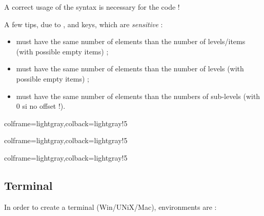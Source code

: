 \documentclass[11pt,a4paper]{ltxdoc}
\begin{document}
A correct usage of the syntax is necessary for the code !

\vspace{5mm}

A few tips, due to ,  and  keys, which are \textit{sensitive} :

\begin{itemize}
	\item {} must have the same number of elements than the number of levels/items (with possible empty items) ;
	\item {} must have the same number of elements than the number of levels (with possible empty items) ;
	\item {} must have the same number of elements than the numbers of sub-levels (with 0 si no offset !).
\end{itemize}

\begin{tcblisting}{colframe=lightgray,colback=lightgray!5}
\end{tcblisting}

\begin{tcblisting}{colframe=lightgray,colback=lightgray!5}
\end{tcblisting}

\begin{tcblisting}{colframe=lightgray,colback=lightgray!5}
\end{tcblisting}

\pagebreak

\subsection{Terminal}

In order to create a terminal (Win/UNiX/Mac), environments are :
\end{document}
